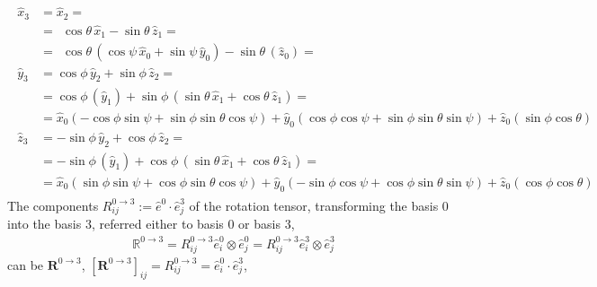 \documentclass[letterpaper,10pt,english]{jupyterBook}
\begin{document}
\sphinxAtStartPar
{}
\begin{equation*}
\begin{split}\begin{aligned}
 \hat{x}_3 & =                  \hat{x}_2                          = \\
           & = \ \ \cos \theta \, \hat{x}_1 - \sin \theta \, \hat{z}_1  = \\
           & = \ \ \cos \theta \, \left( \cos \psi \, \hat{x}_0 + \sin \psi \, \hat{y}_0 \right) - \sin \theta \, \left( \hat{z}_0 \right)  = \\
 \hat{y}_3 & = \cos \phi \, \hat{y}_2 + \sin \phi \, \hat{z}_2 = \\ 
           & = \cos \phi \, \left( \hat{y}_1 \right) + \sin \phi \, \left( \sin \theta \, \hat{x}_1 + \cos \theta \, \hat{z}_1  \right) = \\ 
           & = \hat{x}_0 \left( -\cos\phi \sin \psi + \sin \phi \sin \theta \cos \psi \right) + \hat{y}_0 \left( \cos \phi \cos \psi + \sin \phi \sin \theta \sin \psi \right) + \hat{z}_0 \left( \sin \phi \cos \theta \right) \\
 \hat{z}_3 & = - \sin \phi \, \hat{y}_2 + \cos \phi \, \hat{z}_2 = \\ 
           & = - \sin \phi \, \left( \hat{y}_1 \right) + \cos \phi \, \left( \sin \theta \, \hat{x}_1 + \cos \theta \, \hat{z}_1  \right) = \\    
           & =  \hat{x}_0 \left( \sin \phi \sin \psi + \cos \phi \sin \theta \cos \psi \right) + \hat{y}_0 \left(-\sin \phi \cos \psi + \cos \phi \sin \theta \sin \psi \right) + \hat{z}_0 \left( \cos \phi \cos \theta \right)
\end{aligned}\end{split}
\end{equation*}
\sphinxAtStartPar
The components \(R_{ij}^{0 \rightarrow 3} := \hat{e}^0 \cdot \hat{e}^3_j\) of the rotation tensor, transforming the basis \(0\) into the basis \(3\), referred either to basis \(0\) or basis \(3\),
\begin{equation*}
\begin{split}\mathbb{R}^{0 \rightarrow 3} = R^{0 \rightarrow 3}_{ij} \hat{e}^0_i \otimes \hat{e}^0_j =  R^{0 \rightarrow 3}_{ij} \hat{e}^3_i \otimes \hat{e}^3_j\end{split}
\end{equation*}
\sphinxAtStartPar
can be  \(\mathbf{R}^{0 \rightarrow 3}\), \([\mathbf{R}^{0 \rightarrow 3}]_{ij} = R^{0 \rightarrow 3}_{ij} = \hat{e}^0_i \cdot \hat{e}^3_j\),
\end{document}
